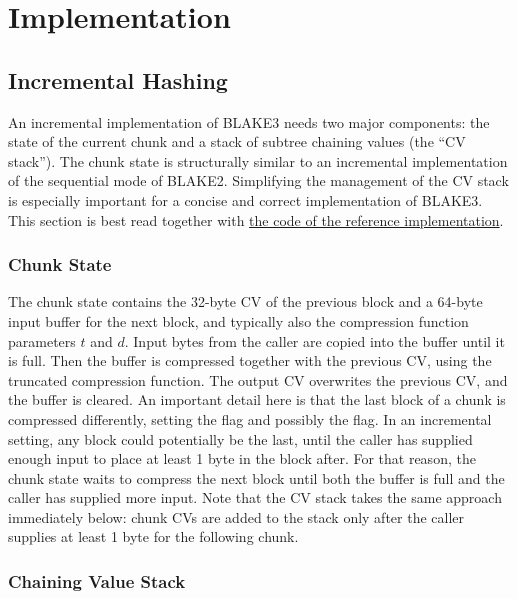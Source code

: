 \documentclass[11pt,notitlepage,a4paper]{article}
\newcommand{\flag}[1]{\texttt{\detokenize{#1}}\xspace}
\begin{document}
\section{Implementation}\label{sec:implementation}

\subsection{Incremental Hashing}\label{sec:incremental}

An incremental implementation of BLAKE3 needs two major components: the state
of the current chunk and a stack of subtree chaining values (the ``CV stack'').
The chunk state is structurally similar to an incremental implementation of the
sequential mode of BLAKE2. Simplifying the management of the CV stack is
especially important for a concise and correct implementation of BLAKE3. This
section is best read together with
\href{https://github.com/veorq/BLAKE3/blob/master/reference_impl/reference_impl.rs}{the code of the reference implementation}.

\subsubsection{Chunk State}\label{sec:chunkstate}

The chunk state contains the 32-byte CV of the previous block and a 64-byte
input buffer for the next block, and typically also the compression function
parameters $t$ and $d$. Input bytes from the caller are copied into the buffer
until it is full. Then the buffer is compressed together with the previous CV,
using the truncated compression function. The output CV overwrites the previous
CV, and the buffer is cleared. An important detail here is that the last block
of a chunk is compressed differently, setting the \flag{CHUNK_END} flag and
possibly the \flag{ROOT} flag. In an incremental setting, any block could
potentially be the last, until the caller has supplied enough input to place at
least 1 byte in the block after. For that reason, the chunk state waits to
compress the next block until both the buffer is full and the caller has
supplied more input. Note that the CV stack takes the same approach immediately
below: chunk CVs are added to the stack only after the caller supplies at least
1 byte for the following chunk.

\subsubsection{Chaining Value Stack}\label{sec:cvstack}
\end{document}
